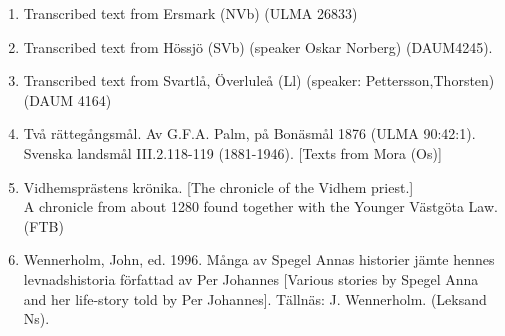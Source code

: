 \begin{enumerate}

\item[\sqbrSenum]

\label{bkm:Ref137880753}Transcribed text from Ersmark (NVb) (ULMA 26833) 


\item[\sqbrSenum]

\label{bkm:Ref137882624}Transcribed text from Hössjö (SVb) (speaker Oskar Norberg) (DAUM4245).


\item[\sqbrSenum]

\label{bkm:Ref137880773}Transcribed text from Svartlå, Överluleå (Ll) (speaker: Pettersson,Thorsten) (DAUM 4164)


\item[\sqbrSenum]

\label{bkm:Ref154203986}Två rättegångsmål. Av G.F.A. Palm, på Bonäsmål 1876 (ULMA 90:42:1). Svenska landsmål III.2.118-119 (1881-1946). [Texts from Mora (Os)]

\item[\sqbrSenum]

\label{bkm:Ref137879614}\label{bkm:Ref261512115}Vidhemsprästens krönika. [The chronicle of the Vidhem priest.]\\
A chronicle from about 1280 found together with the Younger Västgöta Law. (FTB) 

\item[\sqbrSenum]

\label{bkm:Ref150067493}\label{bkm:Ref150327539}Wennerholm, John, ed. 1996. Många av Spegel Annas historier jämte hennes levnadshistoria författad av Per Johannes [Various stories by Spegel Anna and her life-story told by Per Johannes]. Tällnäs: J. Wennerholm. (Leksand Ns). 


\end{enumerate}

